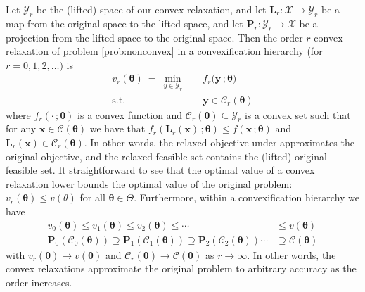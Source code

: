 \documentclass[10pt]{article} %
\theoremstyle{plain}
\theoremstyle{definition}
\theoremstyle{remark}
\begin{document}
Let $\mathcal{Y}_r$ be the (lifted) space of our convex relaxation, and let $\bm{L}_r: \mathcal{X} \to \mathcal{Y}_r$ be a map from the original space to the lifted space, and let $\bm{P}_r: \mathcal{Y}_r \to \mathcal{X}$ be a projection from the lifted space to the original space.
Then the order-$r$ convex relaxation of problem \cref{prob:nonconvex} in a convexification hierarchy (for $r = 0, 1, 2, \ldots)$ is
\begin{equation}
\label{prob:convex-relax}
\begin{aligned}
    v_r(\bm{\theta}) ~=~ \min_{y \in \mathcal{Y}_r} \quad & f_r(\mathbf{y}\, ; \bm{\theta)} \\
    \text{s.t.} \quad & \mathbf{y}\in \mathcal{C}_r(\bm{\theta})
\end{aligned}
\end{equation}
where $f_r(\cdot \, ; \bm{\theta})$ is a convex function and $\mathcal{C}_r(\bm{\theta}) \subseteq \mathcal{Y}_r$ is a convex set such that
for any $\mathbf{x} \in \mathcal{C}(\bm{\theta})$ we have that
$f_r(\bm{L}_r(\bm{x})\, ; \bm{\theta}) \leq f(\mathbf{x}\, ; \bm{\theta})$ 
and 
$\bm{L}_r(\mathbf{x}) \in \mathcal{C}_r(\bm{\theta})$.
In other words, the relaxed objective under-approximates the original objective, and the relaxed feasible set contains the (lifted) original feasible set.
It straightforward to see that the optimal value of a convex relaxation lower bounds the optimal value of the original problem: $v_r(\bm{\theta}) \leq v(\theta)$ for all $\bm{\theta} \in \Theta$.
Furthermore, within a convexification hierarchy we have
\begin{align*}
    v_0(\bm{\theta}) \leq v_1(\bm{\theta}) \leq v_2(\bm{\theta}) \leq \cdots &\leq v(\bm{\theta})\\[4pt]
    \bm{P}_0(\mathcal{C}_0(\bm{\theta})) \supseteq \bm{P}_1(\mathcal{C}_1(\bm{\theta})) \supseteq \bm{P}_2(\mathcal{C}_2(\bm{\theta})) \cdots &\supseteq \mathcal{C}(\bm{\theta})
\end{align*}
with $v_r(\bm{\theta}) \to v(\bm{\theta})$ and $\mathcal{C}_r(\bm{\theta}) \to \mathcal{C}(\bm{\theta})$ as $r \to \infty$. In other words, the convex relaxations approximate the original problem to arbitrary accuracy as the order increases.
\end{document}
